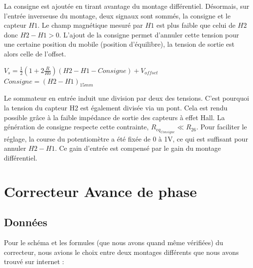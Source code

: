 \documentclass[11pt, french]{article} %
\begin{document}
La consigne est ajoutée en tirant avantage du montage différentiel. Désormais, sur l'entrée inverseuse du montage, deux signaux sont sommés, la consigne et le capteur $H1$. Le champ magnétique mesuré par $H1$ est plus faible que celui de $H2$ donc $H2-H1>0$. L'ajout de la consigne permet d'annuler cette tension pour une certaine position du mobile (position d'équilibre), la tension de sortie est alors celle de l'offset.
\begin{center}
$V_s=\frac{1}{2}(1+2 \frac{R}{R0})(H2-H1-Consigne) + V_{offset}$
$Consigne = (H2-H1)_{15mm}$
\end{center}
Le sommateur en entrée induit une division par deux des tensions. C'est pourquoi la tension du capteur H2 est également divisée via un pont. Cela est rendu possible grâce à la faible impédance de sortie des capteurs à effet Hall. La génération de consigne respecte cette contrainte, $R_{eq_{Consigne}} \ll R_{26}$. Pour faciliter le réglage, la course du potentiomètre a été fixée de 0 à 1V, ce qui est suffisant pour annuler $H2-H1$. Ce gain d'entrée est compensé par le gain du montage différentiel. 




\section{Correcteur Avance de phase}

\subsection{Données}

\noindent
Pour le schéma et les formules (que nous avons quand même vérifiées) du correcteur, nous avions le choix entre deux montages différents que nous avons trouvé sur internet :
\end{document}
